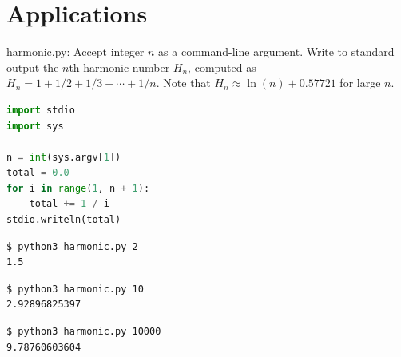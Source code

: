 \documentclass[8pt,a4paper,compress]{beamer}
\begin{document}
\section{Applications}
\begin{frame}[fragile]
\pause

\begin{framed}
\tiny harmonic.py: Accept integer $n$ as a command-line argument. Write to standard output the $n$th harmonic number $H_n$, computed as $H_n=1+1/2+1/3+\cdots+1/n$. Note that $H_n \approx \ln(n) + 0.57721$ for large $n$.
\end{framed}

\begin{lstlisting}[language=Python,style=focusin]
import stdio
import sys

n = int(sys.argv[1])
total = 0.0
for i in range(1, n + 1):
    total += 1 / i
stdio.writeln(total)
\end{lstlisting}

\pause\bigskip

\begin{lstlisting}[language={},style=focusin]
$ python3 harmonic.py 2
1.5
\end{lstlisting}

\pause\bigskip

\begin{lstlisting}[language={},style=focusin]
$ python3 harmonic.py 10
2.92896825397
\end{lstlisting}

\pause\bigskip

\begin{lstlisting}[language={},style=focusin]
$ python3 harmonic.py 10000
9.78760603604
\end{lstlisting}
\end{frame}
\end{document}
